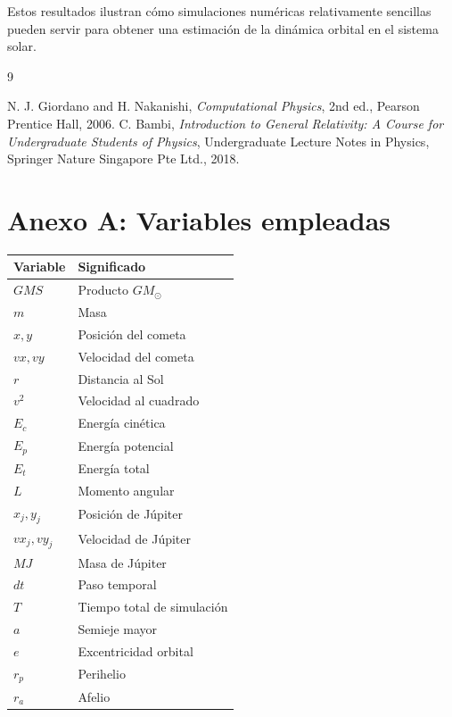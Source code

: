 \documentclass[11pt,a4paper]{article}
\begin{document}
Estos resultados ilustran cómo simulaciones numéricas relativamente sencillas pueden servir para obtener una estimación de la dinámica orbital en el sistema solar.

\begin{thebibliography}{9}

N. J. Giordano and H. Nakanishi,
\textit{Computational Physics},
2nd ed., Pearson Prentice Hall, 2006.
\label{giordano}
C. Bambi,
\textit{Introduction to General Relativity: A Course for Undergraduate Students of Physics},
Undergraduate Lecture Notes in Physics,
Springer Nature Singapore Pte Ltd., 2018.
\label{bambi}


\end{thebibliography}

\newpage
\appendix
\section*{Anexo A: Variables empleadas}

\begin{center}
\begin{tabular}{ll}
\hline
Variable & Significado \\
\hline
$GMS$ & Producto $GM_{\odot}$ \\
$m$ & Masa \\
$x,y$ & Posición del cometa \\
$vx,vy$ & Velocidad del cometa \\
$r$ & Distancia al Sol \\
$v^2$ & Velocidad al cuadrado \\
$E_c$ & Energía cinética \\
$E_p$ & Energía potencial \\
$E_t$ & Energía total \\
$L$ & Momento angular \\
$x_j,y_j$ & Posición de Júpiter \\
$vx_j,vy_j$ & Velocidad de Júpiter \\
$MJ$ & Masa de Júpiter \\
$dt$ & Paso temporal \\
$T$ & Tiempo total de simulación \\
$a$ & Semieje mayor \\
$e$ & Excentricidad orbital \\
$r_p$ & Perihelio \\
$r_a$ & Afelio \\
\hline
\end{tabular}
\end{center}
\end{document}
